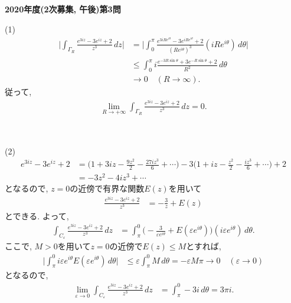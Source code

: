 ﻿\documentclass[a4paper,12pt]{jarticle}
\begin{document}
\begin{center}
\bf{\LARGE 2020年度(2次募集, 午後)第3問}
\end{center}
\noindent
(1)
  \begin{align*}
    \biggl|\int_{\Gamma_R}\frac{e^{3iz}-3e^{iz}+2}{z^3}\,dz\biggr|
    &=\biggl|\int_0^\pi 
    \frac{e^{3iRe^{i\theta}}-3e^{iRe^{i\theta}}+2}
    {(Re^{i\theta})^3}(iRe^{i\theta})\,d\theta\biggr| \\
    &\leq\int_0^\pi
    i\frac{e^{-3R\sin\theta}+3e^{-R\sin\theta}+2}{R^2}
    \,d\theta \\
    &\longrightarrow 0 \quad (R\to \infty).
  \end{align*}
  従って, 
  \begin{align*}
    \lim_{R\to+\infty}\int_{\Gamma_R}
    \frac{e^{3iz}-3e^{iz}+2}{z^3}\,dz=0.
  \end{align*}
\par\ 
\par\noindent
(2)
  \begin{align*}
    e^{3iz}-3e^{iz}+2
    &=\biggl(1+3iz-\frac{9z^2}{2}-\frac{27iz^3}{6}+\cdots\biggr)
    -3\biggl(1+iz-\frac{z^2}{2}-\frac{iz^3}{6}+\cdots\biggr)+2 \\
    &=-3z^2-4iz^3+\cdots
  \end{align*}
  となるので, $z=0$の近傍で有界な関数$E(z)$を用いて
  \begin{align*}
    \frac{e^{3iz}-3e^{iz}+2}{z^3}
    &=-\frac{3}{z}+E(z)
  \end{align*}
  とできる.
  よって, 
  \begin{align*}
    \int_{C_\varepsilon}\frac{e^{3iz}-3e^{iz}+2}{z^3}\,dz
    &=\int_\pi^0 
    \biggl(-\frac{3}{\varepsilon e^{i\theta}}+E(\varepsilon e^{i\theta})\biggr)
    (i\varepsilon e^{i\theta})\,d\theta.
  \end{align*}
  ここで, $M>0$を用いて$z=0$の近傍で$E(z)\leq M$とすれば,
  \begin{align*}
    \biggl|\int_\pi^0 i\varepsilon e^{i\theta}E(\varepsilon e^{i\theta})\,d\theta\biggr|
    &\leq \varepsilon\int_\pi^0 M\,d\theta
    =-\varepsilon M\pi
    \longrightarrow 0 \quad (\varepsilon\to 0)
  \end{align*}
  となるので, 
  \begin{align*}
    \lim_{\varepsilon\to 0}\int_{C_\varepsilon}\frac{e^{3iz}-3e^{iz}+2}{z^3}\,dz
    &=\int_\pi^0 -3i\,d\theta
    =3\pi i.
  \end{align*}
\par\ 
\par\noindent
\end{document}
